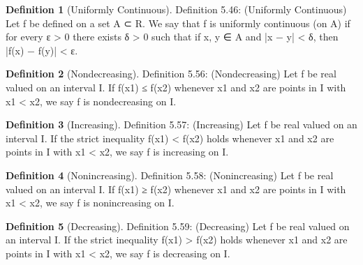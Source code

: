 \documentclass[11pt]{article}
\theoremstyle{definition}
\newtheorem{definition}{Definition}[section]
\begin{document}
\setcounter{definition}{45}
\begin{definition} [Uniformly Continuous]
	Definition 5.46: (Uniformly Continuous) Let f be defined on a set A ⊂ R. We say that f is uniformly
	continuous (on A) if for every ε > 0 there exists δ > 0 such that if x, y ∈ A and |x − y| < δ, then
	|f(x) − f(y)| < ε.
\end{definition}

\setcounter{definition}{55}
\begin{definition} [Nondecreasing]
	Definition 5.56: (Nondecreasing) Let f be real valued on an interval I. If f(x1) ≤ f(x2) whenever x1
	and x2 are points in I with x1 < x2, we say f is nondecreasing on I.
\end{definition}


\begin{definition} [Increasing]
	Definition 5.57: (Increasing) Let f be real valued on an interval I. If the strict inequality f(x1) < f(x2)
	holds whenever x1 and x2 are points in I with x1 < x2, we say f is increasing on I.
\end{definition}


\begin{definition} [Nonincreasing]
	Definition 5.58: (Nonincreasing) Let f be real valued on an interval I. If f(x1) ≥ f(x2) whenever x1
	and x2 are points in I with x1 < x2, we say f is nonincreasing on I.
\end{definition}


\begin{definition} [Decreasing]
	Definition 5.59: (Decreasing) Let f be real valued on an interval I. If the strict inequality f(x1) > f(x2)
	holds whenever x1 and x2 are points in I with x1 < x2, we say f is decreasing on I.
\end{definition}
\end{document}
